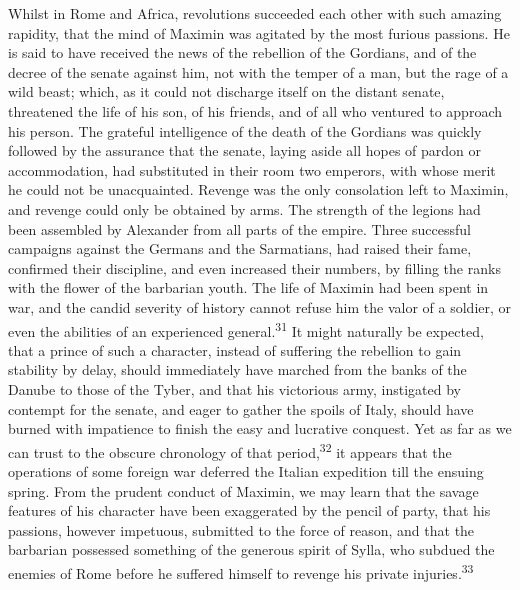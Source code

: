 Whilst in Rome and Africa, revolutions succeeded each other with
such amazing rapidity, that the mind of Maximin was agitated by
the most furious passions. He is said to have received the news
of the rebellion of the Gordians, and of the decree of the senate
against him, not with the temper of a man, but the rage of a wild
beast; which, as it could not discharge itself on the distant
senate, threatened the life of his son, of his friends, and of
all who ventured to approach his person. The grateful
intelligence of the death of the Gordians was quickly followed by
the assurance that the senate, laying aside all hopes of pardon
or accommodation, had substituted in their room two emperors,
with whose merit he could not be unacquainted. Revenge was the
only consolation left to Maximin, and revenge could only be
obtained by arms. The strength of the legions had been assembled
by Alexander from all parts of the empire. Three successful
campaigns against the Germans and the Sarmatians, had raised
their fame, confirmed their discipline, and even increased their
numbers, by filling the ranks with the flower of the barbarian
youth. The life of Maximin had been spent in war, and the candid
severity of history cannot refuse him the valor of a soldier, or
even the abilities of an experienced general.\textsuperscript{31} It might
naturally be expected, that a prince of such a character, instead
of suffering the rebellion to gain stability by delay, should
immediately have marched from the banks of the Danube to those of
the Tyber, and that his victorious army, instigated by contempt
for the senate, and eager to gather the spoils of Italy, should
have burned with impatience to finish the easy and lucrative
conquest. Yet as far as we can trust to the obscure chronology of
that period,\textsuperscript{32} it appears that the operations of some foreign
war deferred the Italian expedition till the ensuing spring. From
the prudent conduct of Maximin, we may learn that the savage
features of his character have been exaggerated by the pencil of
party, that his passions, however impetuous, submitted to the
force of reason, and that the barbarian possessed something of
the generous spirit of Sylla, who subdued the enemies of Rome
before he suffered himself to revenge his private injuries.\textsuperscript{33}


